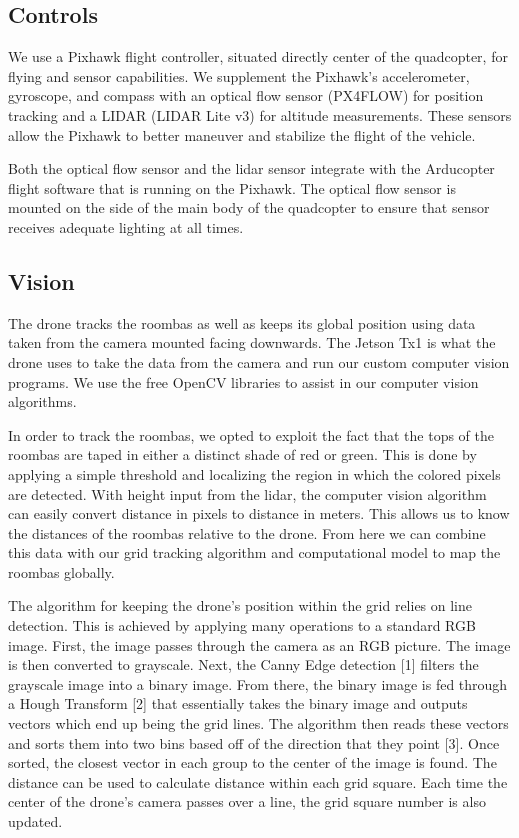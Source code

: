 \documentclass[12pt]{article}
\begin{document}
\subsection{Controls}
We use a Pixhawk flight controller, situated directly center of the quadcopter, for flying and sensor capabilities. We supplement the Pixhawk's accelerometer, gyroscope, and compass with an optical flow sensor (PX4FLOW) for position tracking and a LIDAR (LIDAR Lite v3) for altitude measurements. These sensors allow the Pixhawk to better maneuver and stabilize the flight of the vehicle. 

Both the optical flow sensor and the lidar sensor integrate with the Arducopter flight software that is running on the Pixhawk. The optical flow sensor is mounted on the side of the main body of the quadcopter to ensure that sensor receives adequate lighting at all times. 

\subsection{Vision}

The drone tracks the roombas as well as keeps its global position using data taken from the camera mounted facing downwards. The Jetson Tx1 is what the drone uses to take the data from the camera and run our custom computer vision programs. We use the free OpenCV libraries to assist in our computer vision algorithms. 

In order to track the roombas, we opted to exploit the fact that the tops of the roombas are taped in either a distinct shade of red or green. This is done by applying a simple threshold and localizing the region in which the colored pixels are detected. With height input from the lidar, the computer vision algorithm can easily convert distance in pixels to distance in meters. This allows us to know the distances of the roombas relative to the drone. From here we can combine this data with our grid tracking algorithm and computational model to map the roombas globally.

The algorithm for keeping the drone’s position within the grid relies on line detection. This is achieved by applying many operations to a standard RGB image. First, the image passes through the camera as an RGB picture. The image is then converted to grayscale. Next, the Canny Edge detection [1] filters the grayscale image into a binary image. From there, the binary image is fed through a Hough Transform [2] that essentially takes the binary image and outputs vectors which end up being the grid lines. The algorithm then reads these vectors and sorts them into two bins based off of the direction that they point [3]. Once sorted, the closest vector in each group to the center of the image is found. The distance can be used to calculate distance within each grid square. Each time the center of the drone’s camera passes over a line, the grid square number is also updated.
\end{document}
